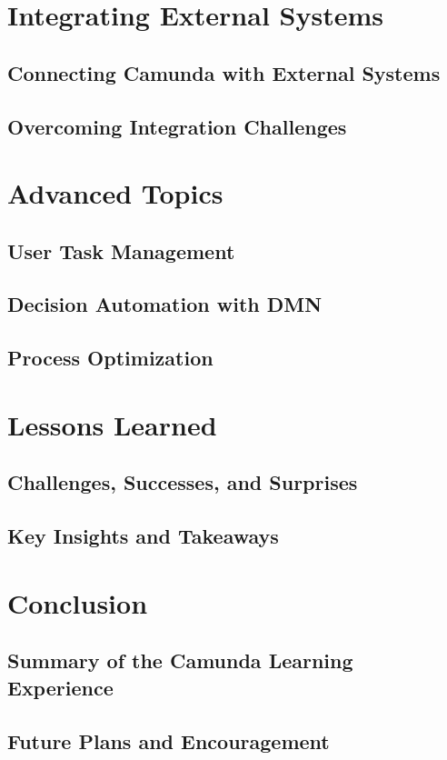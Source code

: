 \documentclass[12pt]{article}
\begin{document}
{\section{Integrating External Systems}
  \subsection{Connecting Camunda with External Systems}
  \subsection{Overcoming Integration Challenges}

\section{Advanced Topics}
  \subsection{User Task Management}
  \subsection{Decision Automation with DMN}
  \subsection{Process Optimization}

\section{Lessons Learned}
  \subsection{Challenges, Successes, and Surprises}
  \subsection{Key Insights and Takeaways}

\section{Conclusion}
  \subsection{Summary of the Camunda Learning Experience}
  \subsection{Future Plans and Encouragement}

}

\printbibliography
\end{document}
